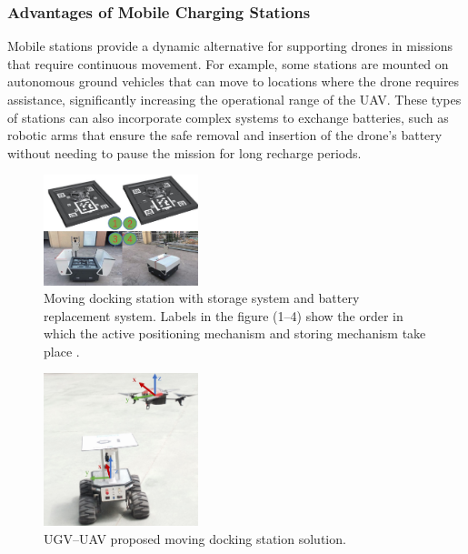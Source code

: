 \subsubsection{Advantages of Mobile Charging Stations}
    Mobile stations provide a dynamic alternative for supporting drones in missions that require continuous movement. For example, some stations are mounted on autonomous ground vehicles that can move to locations where the drone requires assistance, significantly increasing the operational range of the UAV. These types of stations can also incorporate complex systems to exchange batteries, such as robotic arms that ensure the safe removal and insertion of the drone's battery without needing to pause the mission for long recharge periods.
    
    \begin{figure}[h!]
        \centering
        \includegraphics[width=0.4\textwidth]{pictures/mobile_1.png}
        \caption{Moving docking station with storage system and battery replacement system. Labels in the figure (1–4) show the order in which the active positioning mechanism and storing mechanism take place \cite{grlj_docking_stations}.}
        \label{fig:mobile_charging}
    \end{figure}

    \begin{figure}[h!]
        \centering
        \includegraphics[width=0.4\textwidth]{pictures/mobile_2.png}
        \caption{UGV–UAV proposed moving docking station solution.}
        \label{fig:mobile_charging}
    \end{figure}

